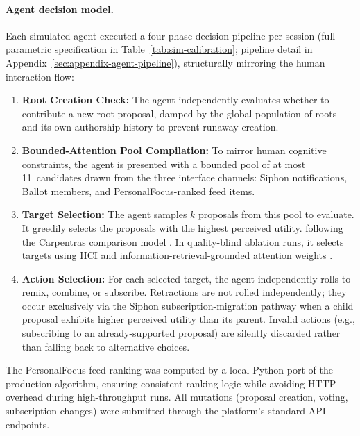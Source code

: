 \documentclass[a4paper, 12pt, twoside]{iviathesis}
\begin{document}
\paragraph{Agent decision model.}
Each simulated agent executed a four-phase decision pipeline per session (full parametric specification in Table~\ref{tab:sim-calibration}; pipeline detail in Appendix~\ref{sec:appendix-agent-pipeline}), structurally mirroring the human interaction flow:
\begin{enumerate}
    \item \textbf{Root Creation Check:} The agent independently evaluates whether to contribute a new root proposal, damped by the global population of roots and its own authorship history to prevent runaway creation.
    \item \textbf{Bounded-Attention Pool Compilation:} To mirror human cognitive constraints, the agent is presented with a bounded pool of at most 11~candidates drawn from the three interface channels: Siphon notifications, Ballot members, and PersonalFocus-ranked feed items. 
    \item \textbf{Target Selection:} The agent samples $k$ proposals from this pool to evaluate. It greedily selects the proposals with the highest perceived utility. following the Carpentras comparison model \cite{carpentras_wisdom_2025}. In quality-blind ablation runs, it selects targets using HCI and information-retrieval-grounded attention weights \cite{pirolli1999, joachims2005accurately}.
     \item \textbf{Action Selection:} For each selected target, the agent independently rolls to remix, combine, or subscribe. Retractions are not rolled independently; they occur exclusively via the Siphon subscription-migration pathway when a child proposal exhibits higher perceived utility than its parent. Invalid actions (e.g., subscribing to an already-supported proposal) are silently discarded rather than falling back to alternative choices.
\end{enumerate}

The PersonalFocus feed ranking was computed by a local Python port of the production algorithm, ensuring consistent ranking logic while avoiding HTTP overhead during high-throughput runs. All mutations (proposal creation, voting, subscription changes) were submitted through the platform's standard API endpoints.
\end{document}
